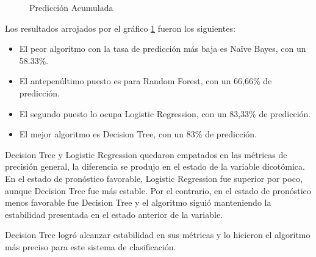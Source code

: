 \begin{center}
    	\begin{figure}[H]
	\centering
	\caption{Predicción Acumulada}
	\label{fig:pa}
	\end{figure}
\end{center}
    
    Los resultados arrojados por el gráfico \ref{fig:pa} fueron los siguientes:
\begin{itemize}
	\item El peor algoritmo con la tasa de predicción más baja es Naïve Bayes, con un 58.33\%.
	\item El antepenúltimo puesto es para Random Forest, con un 66,66\% de predicción.
	\item El segundo puesto lo ocupa Logistic Regression, con un 83,33\% de predicción.
	\item El mejor algoritmo es Decision Tree, con un 83\% de predicción.
\end{itemize}   

	Decision Tree y Logistic Regression quedaron empatados en las métricas de precisión general, la diferencia se produjo en el estado de la variable dicotómica. En el estado de pronóstico favorable, Logistic Regression fue superior por poco, aunque Decision Tree fue más estable. Por el contrario, en el estado de pronóstico menos favorable fue Decision Tree y el algoritmo siguió manteniendo la estabilidad presentada en el estado anterior de la variable.
\par Decision Tree logró alcanzar estabilidad en sus métricas y lo hicieron el algoritmo más preciso para este sistema de clasificación.
